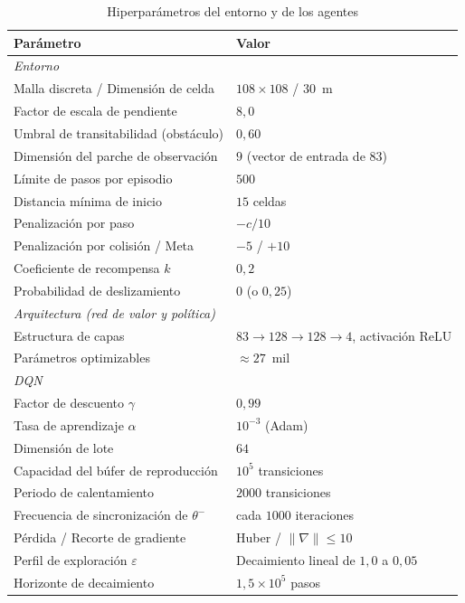 \begin{table}[ht]
\caption{Hiperparámetros del entorno y de los agentes}
\label{tab:hiper}
\centering
\footnotesize
\begin{tabular}{lp{3.3cm}}
\toprule
Parámetro & Valor \\
\midrule
\multicolumn{2}{l}{\textit{Entorno}} \\
Malla discreta / Dimensión de celda  & $108\times108$ / 30~m \\
Factor de escala de pendiente        & $8{,}0$ \\
Umbral de transitabilidad (obstáculo) & $0{,}60$ \\
Dimensión del parche de observación  & $9$ (vector de entrada de 83) \\
Límite de pasos por episodio         & $500$ \\
Distancia mínima de inicio           & $15$ celdas \\
Penalización por paso                & $-c/10$ \\
Penalización por colisión / Meta     & $-5$ / $+10$ \\
Coeficiente de recompensa $k$        & $0{,}2$ \\
Probabilidad de deslizamiento        & $0$ (o $0{,}25$) \\
\midrule
\multicolumn{2}{l}{\textit{Arquitectura (red de valor y política)}} \\
Estructura de capas                  & $83\to128\to128\to4$, activación ReLU \\
Parámetros optimizables              & $\approx 27$~mil \\
\midrule
\multicolumn{2}{l}{\textit{DQN}} \\
Factor de descuento $\gamma$         & $0{,}99$ \\
Tasa de aprendizaje $\alpha$         & $10^{-3}$ (Adam) \\
Dimensión de lote                    & $64$ \\
Capacidad del búfer de reproducción  & $10^5$ transiciones \\
Periodo de calentamiento             & $2000$ transiciones \\
Frecuencia de sincronización de $\theta^-$ & cada $1000$ iteraciones \\
Pérdida / Recorte de gradiente       & Huber / $\lVert\nabla\rVert\le10$ \\
Perfil de exploración $\varepsilon$  & Decaimiento lineal de $1{,}0$ a $0{,}05$ \\
Horizonte de decaimiento             & $1{,}5\times10^{5}$ pasos \\

\end{tabular}
\end{table}
